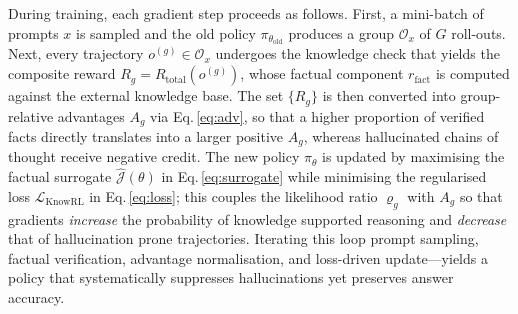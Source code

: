 During training, each gradient step proceeds as follows.  
First, a mini-batch of prompts $x$ is sampled and the old policy
$\pi_{\theta_{\mathrm{old}}}$ produces a group $\mathcal{O}_x$ of
$G$ roll-outs.
Next, every trajectory $o^{(g)}\!\in\!\mathcal{O}_x$ undergoes the
knowledge check that yields the composite reward
$R_g=R_{\mathrm{total}}(o^{(g)})$, whose factual component
$r_{\text{fact}}$ is computed against the external knowledge base.
The set $\{R_g\}$ is then converted into group-relative advantages
$A_g$ via Eq.\,\eqref{eq:adv}, so that a higher proportion of verified
facts directly translates into a larger positive $A_g$, whereas
hallucinated chains of thought receive negative credit.
The new policy $\pi_{\theta}$ is updated by maximising the factual
surrogate $\hat{\mathcal{J}}(\theta)$ in Eq.\,\eqref{eq:surrogate}
while minimising the regularised loss
$\mathcal{L}_{\text{KnowRL}}$ in Eq.\,\eqref{eq:loss};
this couples the likelihood ratio $\varrho_g$ with $A_g$ so that
gradients \emph{increase} the probability of
knowledge supported reasoning and \emph{decrease} that of
hallucination prone trajectories.  
Iterating this loop prompt sampling, factual verification,
advantage normalisation, and loss-driven update---yields a policy that
systematically suppresses hallucinations yet preserves answer accuracy.














































